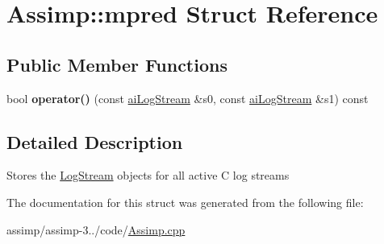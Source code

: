 \hypertarget{struct_assimp_1_1mpred}{\section{Assimp\+:\+:mpred Struct Reference}
\label{struct_assimp_1_1mpred}
}
\subsection*{Public Member Functions}
\begin{DoxyCompactItemize}
\item 
\hypertarget{struct_assimp_1_1mpred_af6dae361b041095d3ea32815ca115a8d}{bool {\bfseries operator()} (const \hyperlink{structai_log_stream}{ai\+Log\+Stream} \&s0, const \hyperlink{structai_log_stream}{ai\+Log\+Stream} \&s1) const }\label{struct_assimp_1_1mpred_af6dae361b041095d3ea32815ca115a8d}

\end{DoxyCompactItemize}


\subsection{Detailed Description}
Stores the \hyperlink{class_assimp_1_1_log_stream}{Log\+Stream} objects for all active C log streams 

The documentation for this struct was generated from the following file\+:\begin{DoxyCompactItemize}
\item 
assimp/assimp-\/3../code/\hyperlink{_assimp_8cpp}{Assimp.\+cpp}\end{DoxyCompactItemize}
